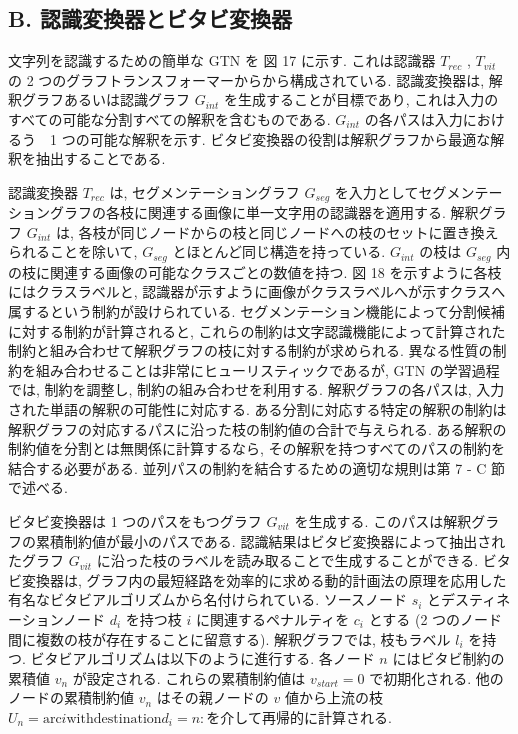 \documentclass[twocolumn]{jarticle}     %
\begin{document}
\subsection*{B. 認識変換器とビタビ変換器}
文字列を認識するための簡単な GTN を 図 17 に示す. これは認識器 ${T_{rec}}$ , ${T_{vit}}$ の 2 つのグラフトランスフォーマーからから構成されている. 
認識変換器は, 解釈グラフあるいは認識グラフ $G_{int}$ を生成することが目標であり, これは入力のすべての可能な分割すべての解釈を含むものである. $G_{int}$ の各パスは入力におけるう　1 つの可能な解釈を示す. ビタビ変換器の役割は解釈グラフから最適な解釈を抽出することである. 
\par
認識変換器 $T_{rec}$ は, セグメンテーショングラフ $G_{seg}$ を入力としてセグメンテーショングラフの各枝に関連する画像に単一文字用の認識器を適用する.
解釈グラフ $G_{int}$ は, 各枝が同じノードからの枝と同じノードへの枝のセットに置き換えられることを除いて, $G_{seg}$ とほとんど同じ構造を持っている. 
$G_{int}$ の枝は $G_{seg}$ 内の枝に関連する画像の可能なクラスごとの数値を持つ.  
図 18 を示すように各枝にはクラスラベルと, 認識器が示すように画像がクラスラベルへが示すクラスへ属するという制約が設けられている. 
セグメンテーション機能によって分割候補に対する制約が計算されると, これらの制約は文字認識機能によって計算された制約と組み合わせて解釈グラフの枝に対する制約が求められる. 
異なる性質の制約を組み合わせることは非常にヒューリスティックであるが, GTN の学習過程では, 制約を調整し, 制約の組み合わせを利用する.
解釈グラフの各パスは, 入力された単語の解釈の可能性に対応する. ある分割に対応する特定の解釈の制約は解釈グラフの対応するパスに沿った枝の制約値の合計で与えられる.
ある解釈の制約値を分割とは無関係に計算するなら, その解釈を持つすべてのパスの制約を結合する必要がある. 並列パスの制約を結合するための適切な規則は第 7 - C 節で述べる.
\par
ビタビ変換器は 1 つのパスをもつグラフ $G_{vit}$ を生成する. このパスは解釈グラフの累積制約値が最小のパスである. 認識結果はビタビ変換器によって抽出されたグラフ $G_{vit}$ に沿った枝のラベルを読み取ることで生成することができる. ビタビ変換器は, グラフ内の最短経路を効率的に求める動的計画法の原理を応用した有名なビタビアルゴリズムから名付けられている. ソースノード $s_i$ とデスティネーションノード $d_i$ を持つ枝 $i$ に関連するペナルティを $c_i$ とする (2 つのノード間に複数の枝が存在することに留意する). 解釈グラフでは, 枝もラベル $l_i$ を持つ. ビタビアルゴリズムは以下のように進行する. 各ノード $n$ にはビタビ制約の累積値 $v_n$ が設定される. これらの累積制約値は $v_{start} = 0$ で初期化される. 他のノードの累積制約値 $v_n$ はその親ノードの $v$ 値から上流の枝 $U_n = {\mathrm{arc} i \mathrm{with destination} d_i = n} :$を介して再帰的に計算される.
\end{document}

